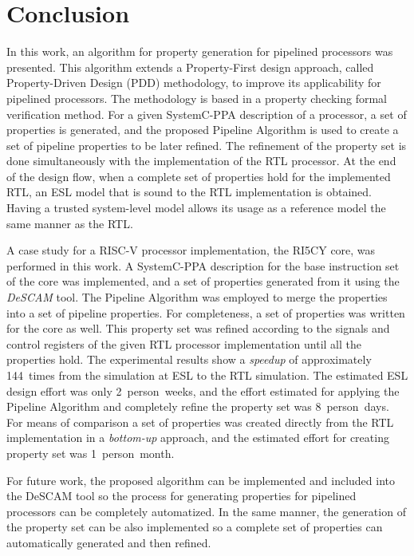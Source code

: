 \chapter{Conclusion}
\label{chapter:conclusion}

In this work, an algorithm for property generation for pipelined processors was presented. This algorithm extends a Property-First design approach, called Property-Driven Design (PDD) methodology, to improve its applicability for pipelined processors. The methodology is based in a property checking formal verification method. For a given SystemC-PPA description of a processor, a set of properties is generated, and the proposed Pipeline Algorithm is used to create a set of pipeline properties to be later refined. The refinement of the property set is done simultaneously with the implementation of the RTL processor. At the end of the design flow, when a complete set of properties hold for the implemented RTL, an ESL model that is sound to the RTL implementation is obtained. Having a trusted system-level model allows its usage as a reference model the same manner as the RTL.

A case study for a RISC-V processor implementation, the RI5CY core, was performed in this work. A SystemC-PPA description for the base instruction set of the core was implemented, and a set of properties generated from it using the \textit{DeSCAM} tool. The Pipeline Algorithm was employed to merge the properties into a set of pipeline properties. For completeness, a set of \SSQED{} properties was written for the core as well. This property set was refined according to the signals and control registers of the given RTL processor implementation until all the properties hold. The experimental results show a \textit{speedup} of approximately 144~times from the simulation at ESL to the RTL simulation. The estimated ESL design effort was only 2~person~weeks, and the effort estimated for applying the Pipeline Algorithm and completely refine the property set was 8~person~days. For means of comparison a set of properties was created directly from the RTL implementation in a \textit{bottom-up} approach, and the estimated effort for creating property set was 1~person~month.

For future work, the proposed algorithm can be implemented and included into the DeSCAM tool so the process for generating properties for pipelined processors can be completely automatized. In the same manner, the generation of the \SSQED{} property set can be also implemented so a complete set of properties can automatically generated and then refined.